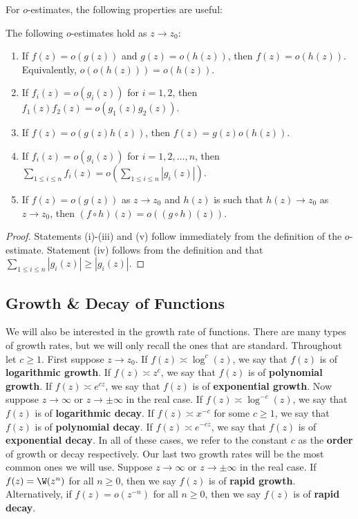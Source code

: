         For $o$-estimates, the following properties are useful:

        \begin{proposition}\label{prop:Little_Oh_manipulations}
            The following $o$-estimates hold as $z \to z_{0}$:
            \begin{enumerate}[label=(\roman*)]
              \item If $f(z) = o(g(z))$ and $g(z) = o(h(z))$, then $f(z) = o(h(z))$. Equivalently, $o(o(h(z))) = o(h(z))$.
              \item If $f_{i}(z) = o(g_{i}(z))$ for $i = 1,2$, then $f_{1}(z)f_{2}(z) = o(g_{1}(z)g_{2}(z))$.
              \item If $f(z) = o(g(z)h(z))$, then $f(z) = g(z)o(h(z))$.
              \item If $f_{i}(z) = o(g_{i}(z))$ for $i = 1,2,\ldots,n$, then $\sum_{1 \le i \le n}f_{i}(z) = o\left(\sum_{1 \le i \le n}|g_{i}(z)|\right)$.
              \item If $f(z) = o(g(z))$ as $z \to z_{0}$ and $h(z)$ is such that $h(z) \to z_{0}$ as $z \to z_{0}$, then $(f \circ h)(z) = o((g \circ h)(z))$.
            \end{enumerate}
        \end{proposition}
        \begin{proof}
          Statements (i)-(iii) and (v) follow immediately from the definition of the $o$-estimate. Statement (iv) follows from the definition and that $\sum_{1 \le i \le n}|g_{i}(z)| \ge |g_{i}(z)|$.
        \end{proof}
      \subsection*{Growth \& Decay of Functions}
        We will also be interested in the growth rate of functions. There are many types of growth rates, but we will only recall the ones that are standard. Throughout let $c \ge 1$. First suppose $z \to z_{0}$. If $f(z) \asymp \log^{c}(z)$, we say that $f(z)$ is of \textbf{logarithmic growth}. If $f(z) \asymp z^{c}$, we say that $f(z)$ is of \textbf{polynomial growth}. If $f(z) \asymp e^{cz}$, we say that $f(z)$ is of \textbf{exponential growth}. Now suppose $z \to \infty$ or $z \to \pm\infty$ in the real case. If $f(z) \asymp \log^{-c}(z)$, we say that $f(z)$ is of \textbf{logarithmic decay}. If $f(z) \asymp x^{-c}$ for some $c \ge 1$, we say that $f(z)$ is of \textbf{polynomial decay}. If $f(z) \asymp e^{-cz}$, we say that $f(z)$ is of \textbf{exponential decay}. In all of these cases, we refer to the constant $c$ as the \textbf{order} of growth or decay respectively. Our last two growth rates will be the most common ones we will use. Suppose $z \to \infty$ or $z \to \pm\infty$ in the real case. If $f(z) = \W(z^{n})$ for all $n \ge 0$, then we say $f(z)$ is of \textbf{rapid growth}. Alternatively, if $f(z) = o(z^{-n})$ for all $n \ge 0$, then we say $f(z)$ is of \textbf{rapid decay}.
